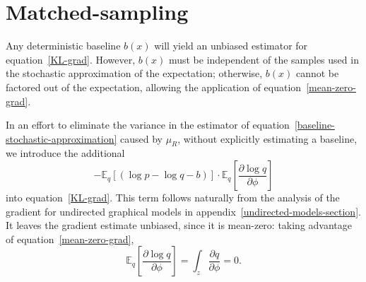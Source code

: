 \documentclass{article} %
\begin{document}
\section{Matched-sampling} \label{matched-sampling-section}

Any deterministic baseline $b(x)$ will yield an unbiased estimator for equation~\ref{KL-grad}.  However, $b(x)$ must be independent of the samples used in the stochastic approximation of the expectation; otherwise, $b(x)$ cannot be factored out of the expectation, allowing the application of equation~\ref{mean-zero-grad}.   

In an effort to eliminate the variance in the estimator of equation~\ref{baseline-stochastic-approximation} caused by $\mu_R$, without explicitly estimating a baseline, we introduce the additional 
\begin{equation*}
-\mathbb{E}_{q} \left[ \left( \log p - \log q - b \right) \right] \cdot \mathbb{E}_{q} \left[ \frac{ \partial \log q}{\partial \phi} \right]
\end{equation*}
into equation~\ref{KL-grad}.  This term follows naturally from the analysis of the gradient for undirected graphical models in appendix~\ref{undirected-models-section}.  It leaves the gradient estimate unbiased, since it is mean-zero: taking advantage of equation~\ref{mean-zero-grad},
\begin{equation*}
\mathbb{E}_{q} \left[ \frac{ \partial \log q}{\partial \phi} \right]  = \int_z \frac{\partial q}{\partial \phi} = 0.
\end{equation*}
\end{document}
